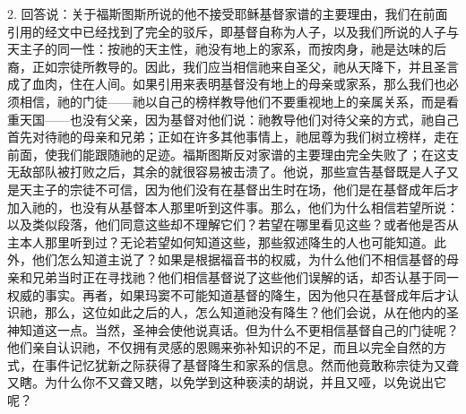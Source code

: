 2. 回答说：关于福斯图斯所说的他不接受耶稣基督家谱的主要理由，我们在前面引用的经文中已经找到了完全的驳斥，即基督自称为人子，以及我们所说的人子与天主子的同一性：按祂的天主性，祂没有地上的家系，而按肉身，祂是达味的后裔，正如宗徒所教导的。因此，我们应当相信祂来自圣父，祂从天降下，并且圣言成了血肉，住在人间。如果引用来表明基督没有地上的母亲或家系，那么我们也必须相信，祂的门徒——祂以自己的榜样教导他们不要重视地上的亲属关系，而是看重天国——也没有父亲，因为基督对他们说：祂教导他们对待父亲的方式，祂自己首先对待祂的母亲和兄弟；正如在许多其他事情上，祂屈尊为我们树立榜样，走在前面，使我们能跟随祂的足迹。福斯图斯反对家谱的主要理由完全失败了；在这支无敌部队被打败之后，其余的就很容易被击溃了。他说，那些宣告基督既是人子又是天主子的宗徒不可信，因为他们没有在基督出生时在场，他们是在基督成年后才加入祂的，也没有从基督本人那里听到这件事。那么，他们为什么相信若望所说：以及类似段落，他们同意这些却不理解它们？若望在哪里看见这些？或者他是否从主本人那里听到过？无论若望如何知道这些，那些叙述降生的人也可能知道。此外，他们怎么知道主说了？如果是根据福音书的权威，为什么他们不相信基督的母亲和兄弟当时正在寻找祂？他们相信基督说了这些他们误解的话，却否认基于同一权威的事实。再者，如果玛窦不可能知道基督的降生，因为他只在基督成年后才认识祂，那么，这位如此之后的人，怎么知道祂没有降生？他们会说，从在他内的圣神知道这一点。当然，圣神会使他说真话。但为什么不更相信基督自己的门徒呢？他们亲自认识祂，不仅拥有灵感的恩赐来弥补知识的不足，而且以完全自然的方式，在事件记忆犹新之际获得了基督降生和家系的信息。然而他竟敢称宗徒为又聋又瞎。为什么你不又聋又瞎，以免学到这种亵渎的胡说，并且又哑，以免说出它呢？\par



\section{}

